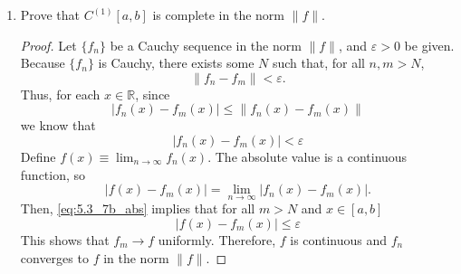 \documentclass{article}
\begin{document}
\begin{enumerate}
\begin{enumerate}
\begin{description}
\begin{proof}
\begin{align*}
                                                                 & = \lVert f\rVert + \lVert g\rVert
                                          \end{align*}
                                    \end{proof}
                        \end{description}
                  \item Prove that $C^{(1)}[a,b]$ is complete in the norm
                        $\lVert f\rVert$.
                        \begin{proof}
                              Let $\{f_n\}$ be a Cauchy sequence in the norm
                              $\lVert f\rVert$, and $\varepsilon>0$ be given.
                              Because $\{f_n\}$ is Cauchy, there exists some $N$
                              such that, for all $n,m>N$,
                              \begin{equation}
                                    \lVert f_n-f_m\rVert<\varepsilon.
                              \end{equation}
                              Thus, for each $x\in\mathbb{R}$, since
                              \begin{equation}
                                    \lvert f_n(x)-f_m(x)\rvert \leq \lVert f_n(x)-f_m(x)\rVert
                              \end{equation}
                              we know that
                              \begin{equation}
                                    \lvert f_n(x)-f_m(x)\rvert < \varepsilon
                                    \label{eq:5.3_7b_abs}
                              \end{equation}
                              Define $f(x)\equiv \lim_{n\to\infty}f_n(x)$. The
                              absolute value is a continuous function, so
                              \begin{equation*}
                                    \lvert f(x)-f_m(x)\rvert = \lim_{n\to\infty}\lvert f_n(x)-f_m(x)\rvert.
                              \end{equation*}
                              Then, \eqref{eq:5.3_7b_abs} implies that for all
                              $m>N$ and $x\in[a,b]$
                              \[
                                    \lvert f(x)-f_m(x)\rvert \leq \varepsilon
                              \]
                              This shows that $f_m\to f$ uniformly. Therefore,
                              $f$ is continuous and $f_n$ converges to $f$ in
                              the norm $\lVert f\rVert$.
                        \end{proof}
            \end{enumerate}
\end{enumerate}
\end{document}
